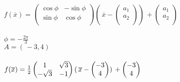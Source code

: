 \documentclass [a4paper,12pt]{article}
\begin{document}
\section{} %
$f({\overline{x}})= \left(
\begin{matrix}
\cos{\phi} & -\sin{\phi}\\
\sin{\phi} & \cos{\phi}\\
\end{matrix}
\right
)
( \, {\overline{x}} -
\left(
\begin{matrix}
a_1\\
a_2\\
\end{matrix}
\right
)
) \, +
\left(
\begin{matrix}
a_1\\
a_2\\
\end{matrix}
\right
)
$\\
\\
$\phi = -\frac{2\pi}{3}$\\
$A=( \, -3, 4) \,$\\
\\
$f({\overline{x}})= \frac{1}{2}\left(
\begin{matrix}
\-1 & \sqrt{3}\\
-\sqrt{3} & -1\\
\end{matrix}
\right
)
( \, {\overline{x}} -
\left(
\begin{matrix}
-3\\
4\\
\end{matrix}
\right
)
) \, +
\left(
\begin{matrix}
-3\\
4\\
\end{matrix}
\right
)
$\\
\end{document}

